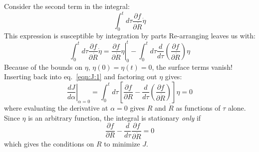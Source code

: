 \documentclass[letterpaper]{tufte-handout}
\newcommand{\laeq}[1]{\label{eqn:#1}}
\renewcommand{\refeq}[1]{eq.~\ref{eqn:#1}}
\renewcommand{\refeq}[1]{eq.~\ref{eqn:#1}}
\begin{document}
Consider the second term in the integral:
\begin{equation*}
  \int_{0}^{t}d\tau\frac{\partial f}{\partial \dot{R}}\dot{\eta}
\end{equation*}
This expression is susceptible by integration by parts
Re-arranging leaves us with:
\begin{equation*}
  \int_{0}^{t}d\tau\frac{\partial f}{\partial \dot{R}}\dot{\eta} = {\left. \frac{\partial f}{\partial \dot{R}} \eta \right|}_0^t - \int_{0}^{t}d\tau \frac{d}{d\tau} \left( \frac{\partial f}{\partial \dot{R}} \right) \eta
\end{equation*}
Because of the bounds on $\eta$, $\eta(0)=\eta(t)=0$, the surface terms vanish! Inserting back into \refeq{J:1} and factoring out $\eta$ gives:
\begin{equation}\laeq{J:2}
  {\left. \frac{d J}{d \alpha} \right|}_{\alpha=0} = 
  \int_{0}^{t}d\tau \left[ \frac{\partial f}{\partial R} - \frac{d}{d\tau} \left( \frac{\partial f}{\partial \dot{R}} \right) \right] \eta = 0
\end{equation}
where evaluating the derivative at $\alpha=0$ gives $R$ and $\dot{R}$ as functions of $\tau$ alone. Since $\eta$ is an arbitrary function, the integral is stationary \emph{only} if
\begin{equation}\laeq{G2-11}
  \frac{\partial f}{\partial R} - \frac{d}{d\tau}\frac{\partial f}{\partial\dot{R}}  = 0
\end{equation}
which gives the conditions on $R$ to minimize $J$.
\end{document}
